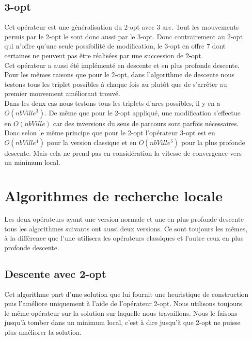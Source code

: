 \documentclass[12pt,a4paper]{article}
\begin{document}
\subsection{3-opt}
Cet opérateur est une généralisation du 2-opt avec 3 arc. Tout les mouvements permis par le 2-opt le sont donc aussi par le 3-opt. Donc contrairement au 2-opt qui n'offre qu'une seule possibilité de modification, le 3-opt en offre 7 dont certaines ne peuvent pas être réalisées par une succession de 2-opt.\\

Cet opérateur a aussi été implémenté en descente et en plus profonde descente.\\
Pour les mêmes raisons que pour le 2-opt, dans l'algorithme de descente nous testons tous les triplet possibles à chaque fois au plutôt que de s’arrêter au premier mouvement améliorant trouvé.\\

Dans les deux cas nous testons tous les triplets d'arcs possibles, il y en a $O(nbVille ^3)$. De même que pour le 2-opt appliqué, une modification s'effectue en $O(nbVille)$ car des inversions du sens de parcours sont parfois nécessaires. Donc selon le même principe que pour le 2-opt l'opérateur 3-opt est en $O(nbVille^4)$ pour la version classique et en $O(nbVille^3)$ pour la plus profonde descente. Mais cela ne prend pas en considération la vitesse de convergence vers un minimum local.\\

\section{Algorithmes de recherche locale}

Les deux opérateurs ayant une version normale et une en plus profonde descente tous les algorithmes suivants ont aussi deux versions. Ce sont toujours les mêmes, à la différence que l'une utilisera les opérateurs classiques et l'autre ceux en plus profonde descente.

\subsection{Descente avec 2-opt}

Cet algorithme part d'une solution que lui fournit une heuristique de construction puis l’améliore uniquement à l'aide de l'opérateur 2-opt. Nous utilisons toujours le même opérateur sur la solution sur laquelle nous travaillons. Nous le faisons jusqu’à tomber dans un minimum local, c'est à dire jusqu’à que 2-opt ne puisse plus améliorer la solution.
\end{document}
